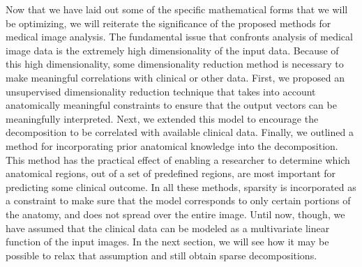\documentclass[11pt]{nih}
\begin{document}
Now that we have laid out some of the specific mathematical forms that we will be optimizing, we will reiterate the significance of the proposed methods for medical image analysis.  The fundamental issue that confronts analysis of medical image data is the extremely high dimensionality of the input data.  Because of this high dimensionality, some dimensionality reduction method is necessary to make meaningful correlations with clinical or other data.  First, we proposed an unsupervised dimensionality reduction technique that takes into account anatomically meaningful constraints to ensure that the output vectors can be meaningfully interpreted.  Next, we extended this model to encourage the decomposition to be correlated with available clinical data.  Finally, we outlined a method for incorporating prior anatomical knowledge into the decomposition.  This method has the practical effect of enabling a researcher to determine which anatomical regions, out of a set of predefined regions, are most important for predicting some clinical outcome.  In all these methods, sparsity is incorporated as a constraint to make sure that the model corresponds to only certain portions of the anatomy, and does not spread over the entire image.  Until now, though, we have assumed that the clinical data can be modeled as a multivariate linear function of the input images.  In the next section, we will see how it may be possible to relax that assumption and still obtain sparse decompositions. 
\end{document}
